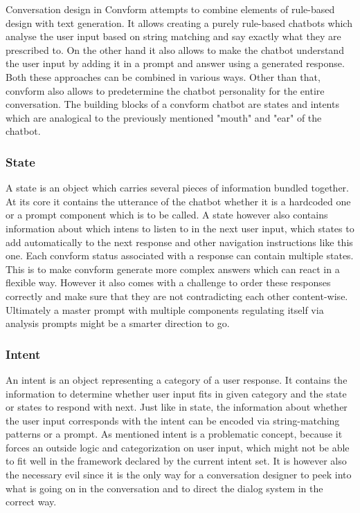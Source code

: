 \documentclass[12pt]{report}
\begin{document}
{\par
Conversation design in Convform attempts
to combine elements of rule-based design with text generation.
It allows creating a purely rule-based chatbots
which analyse the user input based on string matching
and say exactly what they are prescribed to.
On the other hand it also allows to make the chatbot
understand the user input by adding it in a prompt
and answer using a generated response.
Both these approaches can be combined in various ways.
Other than that, convform also allows to predetermine
the chatbot personality for the entire conversation.
The building blocks of a convform chatbot are
states and intents which are
analogical to the previously mentioned "mouth" and "ear"
of the chatbot.

\subsubsection{State}
A state is an object which carries several pieces of information
bundled together.
At its core it contains the utterance of the chatbot
whether it is a hardcoded one or a prompt component which is to be called.
A state however also contains information about
which intens to listen to in the next user input,
which states to add automatically to the next response
and other navigation instructions like this one.
Each convform status associated with a response
can contain multiple states.
This is to make convform generate more complex answers
which can react in a flexible way.
However it also comes with a challenge to order these responses correctly
and make sure that they are not contradicting each other content-wise.
Ultimately a master prompt with multiple components
regulating itself via analysis prompts
might be a smarter direction to go.

\subsubsection{Intent}
An intent is an object representing a category of a user response.
It contains the information to determine whether
user input fits in given category and
the state or states to respond with next.
Just like in state, the information about whether the user input
corresponds with the intent can be encoded via
string-matching patterns or a prompt.
As mentioned intent is a problematic concept,
because it forces an outside logic and categorization
on user input, which might not be able to fit well
in the framework declared by the current intent set.
It is however also the necessary evil since
it is the only way for a conversation designer
to peek into what is going on in the conversation
and to direct the dialog system in the correct way.

}
\end{document}
